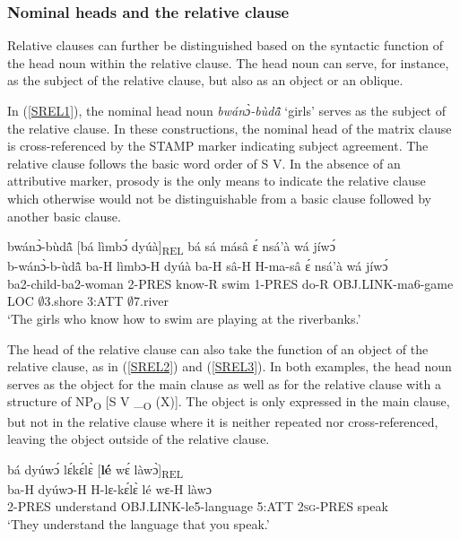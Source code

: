 \subsubsection{Nominal heads and the relative clause}
\label{sec:RELsyn}

Relative clauses can further be distinguished based on the syntactic function of the head noun within the relative clause. The head noun can serve, for instance, as the subject of the relative clause, but also as an object or an oblique.

In (\ref{SREL1}), the nominal head noun {\itshape bwánɔ̀-bùdã̂̂} `girls' serves as the subject of the relative clause. In these constructions, the nominal head of the matrix clause is cross-referenced by the STAMP marker indicating subject agreement. The relative clause follows the basic word order of S V. In the absence of an attributive marker, prosody is the only means to indicate the relative clause which otherwise would not be distinguishable from a basic clause followed by another basic clause.

\begin{exe}
\ex \label{SREL1}
  \glll  bwánɔ̀-bùdã̂ [bá lìmbɔ́ dyúà]\textsubscript{REL} bá sá másâ ɛ́ nsá'à wá jíwɔ́ \\
         b-wánɔ̀-b-ùdã̂ ba-H lìmbɔ-H dyúà ba-H sâ-H H-ma-sâ ɛ́ nsá'à wá jíwɔ́ \\
         ba2-child-ba2-woman 2-PRES know-R swim 1-PRES do-R OBJ.LINK-ma6-game LOC $\emptyset$3.shore 3:ATT $\emptyset$7.river  \\
    \trans `The girls who know how to swim are playing at the riverbanks.'
\end{exe}

The head of the relative clause can also take the function of an object of the relative clause, as in (\ref{SREL2}) and (\ref{SREL3}). In both examples, the head noun serves as the object for the main clause as well as for the relative clause with a structure of NP\textsubscript{O} [S V \_\textsubscript{O} (X)]. The object is only expressed in the main clause, but not in the relative clause where it is neither repeated nor cross-referenced, leaving the object outside of the relative clause. 

\begin{exe} 
\ex\label{SREL2} 
  \glll bá dyúwɔ́ lɛ́kɛ́lɛ̀ [{\bfseries lé} wɛ́ làwɔ̀]\textsubscript{REL} \\
        ba-H dyúwɔ-H H-lɛ-kɛ́lɛ̀ lé wɛ-H làwɔ \\
         2-PRES understand OBJ.LINK-le5-language 5:ATT 2\textsc{sg}-PRES speak \\
    \trans `They understand the language that you speak.'
\end{exe}

